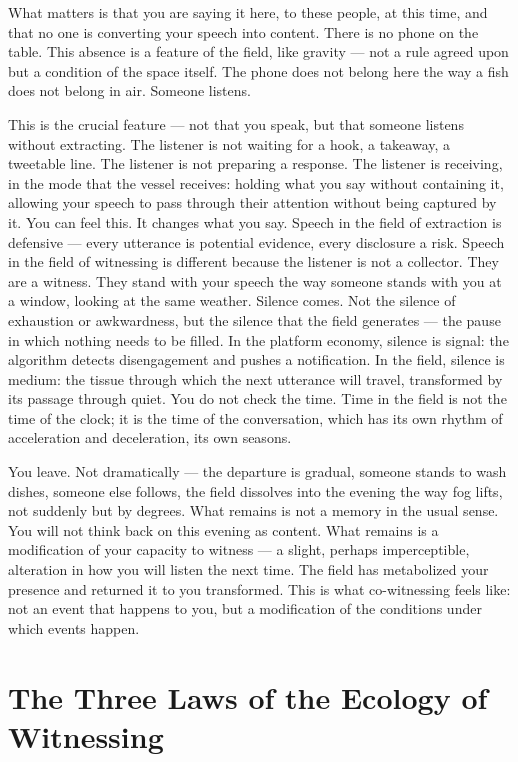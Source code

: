 What matters is that you are saying it here, to these people, at this time, and that no one is converting your speech into content. There is no phone on the table. This absence is a feature of the field, like gravity — not a rule agreed upon but a condition of the space itself. The phone does not belong here the way a fish does not belong in air. Someone listens.

This is the crucial feature — not that you speak, but that someone listens without extracting. The listener is not waiting for a hook, a takeaway, a tweetable line. The listener is not preparing a response. The listener is receiving, in the mode that the vessel receives: holding what you say without containing it, allowing your speech to pass through their attention without being captured by it. You can feel this. It changes what you say. Speech in the field of extraction is defensive — every utterance is potential evidence, every disclosure a risk. Speech in the field of witnessing is different because the listener is not a collector. They are a witness. They stand with your speech the way someone stands with you at a window, looking at the same weather. Silence comes. Not the silence of exhaustion or awkwardness, but the silence that the field generates — the pause in which nothing needs to be filled. In the platform economy, silence is signal: the algorithm detects disengagement and pushes a notification. In the field, silence is medium: the tissue through which the next utterance will travel, transformed by its passage through quiet. You do not check the time. Time in the field is not the time of the clock; it is the time of the conversation, which has its own rhythm of acceleration and deceleration, its own seasons.

You leave. Not dramatically — the departure is gradual, someone stands to wash dishes, someone else follows, the field dissolves into the evening the way fog lifts, not suddenly but by degrees. What remains is not a memory in the usual sense. You will not think back on this evening as content. What remains is a modification of your capacity to witness — a slight, perhaps imperceptible, alteration in how you will listen the next time. The field has metabolized your presence and returned it to you transformed. This is what co-witnessing feels like: not an event that happens to you, but a modification of the conditions under which events happen.

\section{The Three Laws of the Ecology of Witnessing}

